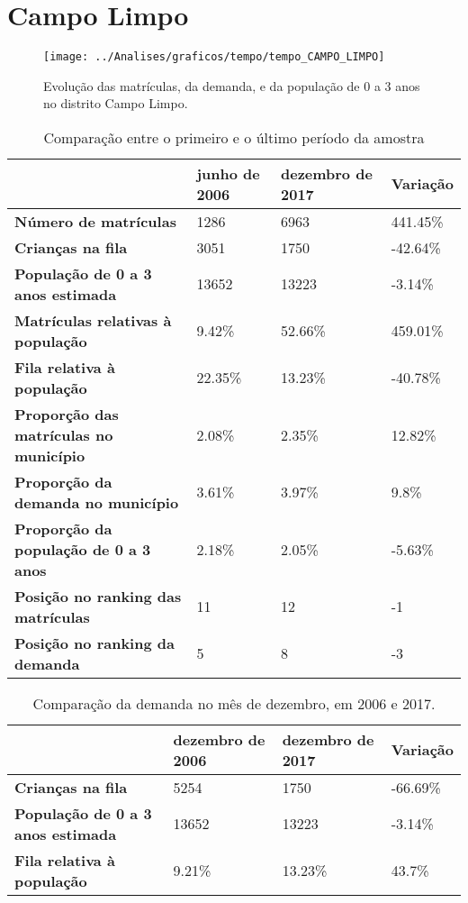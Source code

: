 \section{Campo Limpo}
\begin{figure}[H]
\centering
\texttt{[image: ../Analises/graficos/tempo/tempo\_CAMPO\_LIMPO]}
\caption{Evolução das matrículas, da demanda, e da população de 0 a 3 anos no distrito Campo Limpo.}
\end{figure}
\begin{table}[H]
\begin{tabular}{|l|l|l|l|}
\hline
\textbf{}                                      & \textbf{junho de 2006}       & \textbf{dezembro de 2017}    & \textbf{Variação} \\ \hline
\textbf{Número de matrículas}                  & 1286 & 6963 & 441.45\% \\ \hline
\textbf{Crianças na fila}                      & 3051 & 1750 & -42.64\% \\ \hline
\textbf{População de 0 a 3 anos estimada}      & 13652 & 13223 & -3.14\% \\ \hline
\textbf{Matrículas relativas à população}      & 9.42\% & 52.66\% & 459.01\% \\ \hline
\textbf{Fila relativa à população}             & 22.35\% & 13.23\% & -40.78\% \\ \hline
\textbf{Proporção das matrículas no município} & 2.08\% & 2.35\% & 12.82\% \\ \hline
\textbf{Proporção da demanda no município}     & 3.61\% & 3.97\% & 9.8\% \\ \hline
\textbf{Proporção da população de 0 a 3 anos}  & 2.18\% & 2.05\% & -5.63\% \\ \hline
\textbf{Posição no ranking das matrículas}     & 11 & 12 & -1 \\ \hline
\textbf{Posição no ranking da demanda}         & 5 & 8 & -3 \\ \hline
\end{tabular}
\caption{Comparação entre o primeiro e o último período da amostra}
\end{table}
\begin{table}[H]
\begin{tabular}{|l|l|l|l|}
\hline
\textbf{}                                 & \textbf{dezembro de 2006} & \textbf{dezembro de 2017} & \textbf{Variação} \\ \hline
\textbf{Crianças na fila}                      & 5254 & 1750 & -66.69\% \\ \hline
\textbf{População de 0 a 3 anos estimada}      & 13652 & 13223 & -3.14\% \\ \hline
\textbf{Fila relativa à população}             & 9.21\% & 13.23\% & 43.7\% \\ \hline
\end{tabular}
\caption{Comparação da demanda no mês de dezembro, em 2006 e 2017.}
\end{table}
